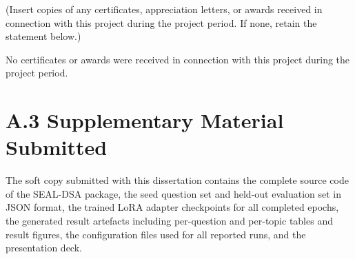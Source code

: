 \documentclass[12pt,a4paper]{report}
\begin{document}
(Insert copies of any certificates, appreciation letters, or awards received in connection with this project during the project period. If none, retain the statement below.)

No certificates or awards were received in connection with this project during the project period.

\section*{A.3 Supplementary Material Submitted}

The soft copy submitted with this dissertation contains the complete source code of the SEAL-DSA package, the seed question set and held-out evaluation set in JSON format, the trained LoRA adapter checkpoints for all completed epochs, the generated result artefacts including per-question and per-topic tables and result figures, the configuration files used for all reported runs, and the presentation deck.
\end{document}
